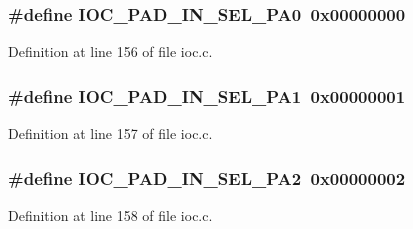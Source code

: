 \subsubsection[{\texorpdfstring{I\+O\+C\+\_\+\+P\+A\+D\+\_\+\+I\+N\+\_\+\+S\+E\+L\+\_\+\+P\+A0}{IOC_PAD_IN_SEL_PA0}}]{\setlength{\rightskip}{0pt plus 5cm}\#define I\+O\+C\+\_\+\+P\+A\+D\+\_\+\+I\+N\+\_\+\+S\+E\+L\+\_\+\+P\+A0~0x00000000}\hypertarget{group__ioc__api_ga12b83b520d01e6ae706217908e48b13e}{}\label{group__ioc__api_ga12b83b520d01e6ae706217908e48b13e}


Definition at line 156 of file ioc.\+c.

\subsubsection[{\texorpdfstring{I\+O\+C\+\_\+\+P\+A\+D\+\_\+\+I\+N\+\_\+\+S\+E\+L\+\_\+\+P\+A1}{IOC_PAD_IN_SEL_PA1}}]{\setlength{\rightskip}{0pt plus 5cm}\#define I\+O\+C\+\_\+\+P\+A\+D\+\_\+\+I\+N\+\_\+\+S\+E\+L\+\_\+\+P\+A1~0x00000001}\hypertarget{group__ioc__api_gadd8921f12453d76c8af1d20309dd5278}{}\label{group__ioc__api_gadd8921f12453d76c8af1d20309dd5278}


Definition at line 157 of file ioc.\+c.

\subsubsection[{\texorpdfstring{I\+O\+C\+\_\+\+P\+A\+D\+\_\+\+I\+N\+\_\+\+S\+E\+L\+\_\+\+P\+A2}{IOC_PAD_IN_SEL_PA2}}]{\setlength{\rightskip}{0pt plus 5cm}\#define I\+O\+C\+\_\+\+P\+A\+D\+\_\+\+I\+N\+\_\+\+S\+E\+L\+\_\+\+P\+A2~0x00000002}\hypertarget{group__ioc__api_gae44ae49ef5ad0dbd6bab9c66cedb4bd1}{}\label{group__ioc__api_gae44ae49ef5ad0dbd6bab9c66cedb4bd1}


Definition at line 158 of file ioc.\+c.


